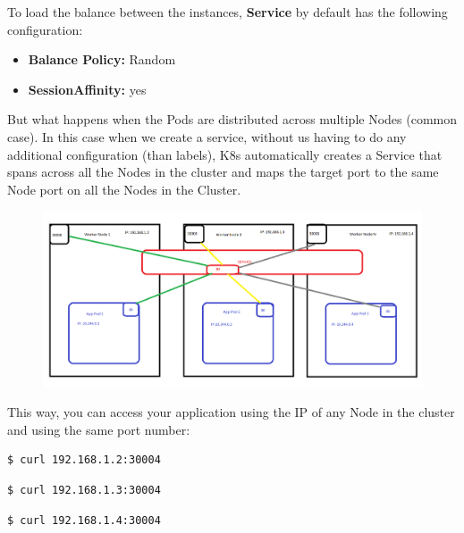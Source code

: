 \documentclass{article}
\newenvironment{blocktemplateI}[1]{%
    \tcolorbox[beamer,%
    noparskip,breakable,
    colframe=Violet,%
    colbacklower=Black,%
    title=#1]}%
    {\endtcolorbox}
\newenvironment{codetemplate}[1][]{%
  \mybasecolorbox[#1]
  \itshape
}{%
  \endmybasecolorbox
}
\begin{document}
\begin{blocktemplateI}{NOTE}
To load the balance between the instances, \textbf{Service} by default has the following configuration:

\begin{itemize}
    \item \textbf{Balance Policy:} Random
    \item \textbf{SessionAffinity:} yes
\end{itemize}
\end{blocktemplateI}

But what happens when the Pods are distributed across multiple Nodes (common case). In this case when we create a service, without us having to do any additional configuration (than labels), K8s automatically creates a Service that spans across all the Nodes in the cluster and maps the target port to the same Node port on all the Nodes in the Cluster.

\begin{figure}[H]
    \centering
    \includegraphics[width=\textwidth]{pictures/service5.png}
\end{figure}

This way, you can access your application using the IP of any Node in the cluster and using the same port number:

\begin{codetemplate}{}
\begin{verbatim}
$ curl 192.168.1.2:30004
\end{verbatim}
\end{codetemplate}

\begin{codetemplate}{}
\begin{verbatim}
$ curl 192.168.1.3:30004
\end{verbatim}
\end{codetemplate}

\begin{codetemplate}{}
\begin{verbatim}
$ curl 192.168.1.4:30004
\end{verbatim}
\end{codetemplate}
\end{document}
